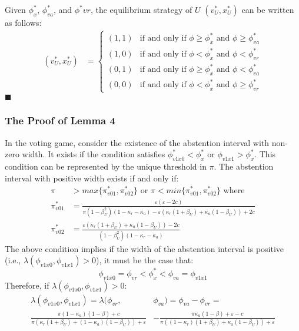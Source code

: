 \par Given $\phi^*_x$, $\phi^*_{va}$, and $\phi^*{vr}$, the equilibrium strategy of $U$ $(v^*_U,x^*_U)$ can be written as follows: 
\begin{align*}
(v^*_U, x^*_U) &= 
\begin{cases}
(1, 1) & \text{if and only if $\phi \geq \phi^*_x$ and $\phi \geq \phi^*_{va}$}\\
(1, 0) & \text{if and only if $\phi < \phi^*_x$ and $\phi < \phi^*_{vr}$}\\
(0, 1) & \text{if and only if $\phi \geq \phi^*_x$ and $\phi < \phi^*_{va}$}\\
(0, 0) & \text{if and only if $\phi < \phi^*_x$ and $\phi \geq \phi^*_{vr}$}
\end{cases}
\end{align*}
\hfill $\blacksquare$

\subsubsection{The Proof of Lemma 4}

\par In the voting game, consider the existence of the abstention interval with non-zero width. It exists if the condition satisfies $\phi^*_{v1x0} < \phi^*_x$ or $\phi_{v1x1} > \phi^*_x$. This condition can be represented by the unique threshold in $\pi$. The abstention interval with positive width exists if and only if:
\begin{align*}
\pi &> max \{\pi^*_{v01}, \pi^*_{v02}\}  \text{ or } \pi < min \{\pi^*_{v01}, \pi^*_{v02} \}  \text{ where } \\
\pi^*_{v01} &= \frac{\varepsilon( \varepsilon - 2c ) }{\pi (1 - \beta_U^2) (1- \kappa_{r} - \kappa_{a}) - \varepsilon ( \kappa_{r} (1 + \beta_U) + \kappa_{a} (1-\beta_U )) + 2c}  \\ 
\pi^*_{v02} &= \frac{\varepsilon (\kappa_{r}(1 + \beta_U) + \kappa_{a} (1-\beta_U)) - 2c}{(1 -\beta_U^2)(1-\kappa_{r}-\kappa_{a})} 
\end{align*}
\noindent The above condition implies if the width of the abstention interval is positive (i.e., $\lambda(\phi_{v1x0},\phi_{v1x1})>0$), it must be the case that:
$$\phi_{v1x0}=\phi_{vr}<\phi^*_x<\phi_{va}=\phi_{v1x1}$$
\noindent Therefore, if $\lambda(\phi_{v1x0},\phi_{v1x1})>0$:
\begin{align*}
\lambda(\phi_{v1x0},\phi_{v1x1}) = \lambda(\phi_{vr},&\phi_{va}) = \phi_{va}-\phi_{vr}= \\ 
\frac{\pi (1- \kappa_{a}) (1-\beta) + c}{\pi (\kappa_{r} (1+\beta_U) + (1 - \kappa_{a}) (1-\beta_U)) + \varepsilon} &- \frac{\pi \kappa_{a} (1-\beta) + \varepsilon - c}{\pi ( (1-\kappa_{r}) (1+\beta_U) + \kappa_{a} (1-\beta_U)) + \varepsilon} \\
\end{align*}


